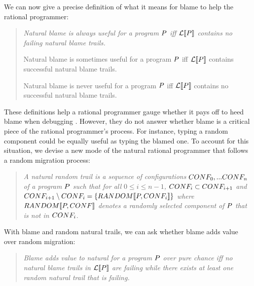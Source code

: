  We can now give a precise definition of what it
means for blame to help the rational programmer:
\begin{quote}
\it
  Natural blame is always useful for a program $P$ iff 
  $\mathcal{L}\llbracket P\rrbracket$ contains no failing natural blame trails.

   Natural blame is sometimes useful for a program $P$ iff 
  $\mathcal{L}\llbracket P\rrbracket$ contains successful natural blame trails.

   Natural blame is never useful for a program $P$ iff 
  $\mathcal{L}\llbracket P\rrbracket$ contains no successful natural blame trails.

\end{quote}

These definitions help a rational programmer gauge whether it pays off to heed blame
when debugging \system. 
However, they do not answer whether blame is a critical piece of 
the rational programmer's process.  For instance, 
typing a random component   could be equally useful as typing the blamed one. 
To account for this situation, we devise a new
mode of the natural rational programmer that 
 follows a random migration process:
\begin{quote}
\it 
A natural random trail
is a sequence of configurations $CONF_0,...CONF_n$ of a program
$P$  such that for all $0 \leq i \leq n - 1$, $CONF_i \subset CONF_{i+1}$ and
$CONF_{i+1} \setminus CONF_i = \{RANDOM\llbracket P, CONF_i\rrbracket\}$
where $RANDOM\llbracket P, CONF\rrbracket$ denotes a randomly selected component of $P$
that is not in $CONF_i$.
\end{quote}
\indent
With blame and random natural trails, we can ask whether 
blame adds value over random migration: 
\begin{quote}
\it
  Blame adds value to natural for a program $P$ over pure chance iff 
  no natural blame trails in  $\mathcal{L}\llbracket P\rrbracket$ are failing while 
 there exists at least one random natural trail that is
  failing.
\end{quote}


